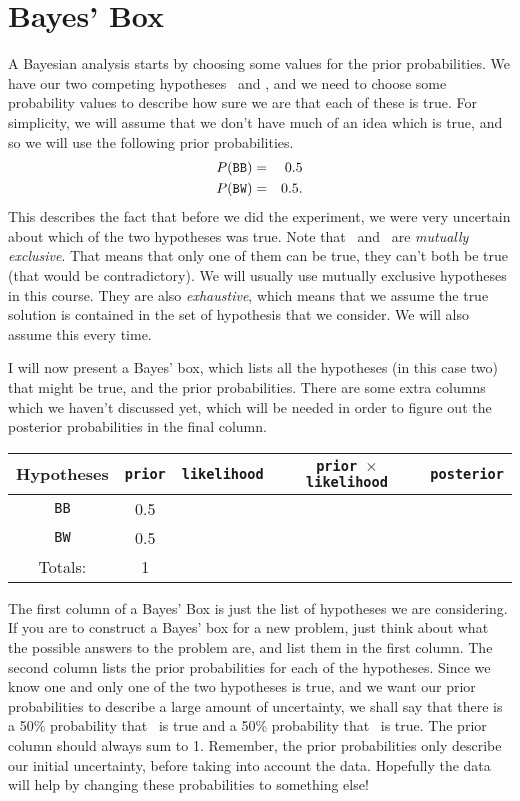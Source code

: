 \section{Bayes' Box}
A Bayesian analysis starts by choosing some values for the prior probabilities.
We have our two competing hypotheses \bw~and \bb, and we need to choose some
probability values to describe how sure we are that each of these is true.
For simplicity, we will assume that we don't have much of an idea which is true,
and so we will use the following prior probabilities.
\begin{eqnarray}
P(\texttt{BB}) &=& 0.5\\
P(\texttt{BW}) &=& 0.5.
\end{eqnarray}
This describes the fact that before we did the experiment, we were very
uncertain about which of the two hypotheses was true. Note that \bw~and \bb~are
{\it mutually exclusive}. That means that only one of
them can be true, they can't both be true (that would be contradictory). We will
usually use mutually exclusive hypotheses in this course. They are also
{\it exhaustive}, which means that we assume the true solution is contained
in the set of hypothesis that we consider. We will also assume this every time.

I will now present a Bayes' box, which lists all the hypotheses (in this case
two) that might be true, and the prior probabilities. There are some extra
columns which we haven't discussed yet, which will be needed in order to
figure out the posterior probabilities in the final column.
\begin{table}[h!]
\begin{center}
\begin{tabular}{|c|c|c|c|c|}
\hline
{\bf Hypotheses} & {\tt prior} & {\tt likelihood} &
{\tt prior $\times$ likelihood} & {\tt posterior}\\
\hline
{\tt BB} & 0.5 &   &  & \\
{\tt BW} & 0.5 &   &  & \\
\hline
Totals: & 1 & & & \\
\hline
\end{tabular}
\end{center}
\end{table}
The first column of a Bayes' Box is just the list of hypotheses we are
considering. If you are to construct a Bayes' box for a new problem, just think
about what the possible answers to the problem are, and list them in the first
column. The second column lists the prior probabilities for each of the
hypotheses.
Since we know one and only
one of the two hypotheses is true, and we want our prior probabilities to
describe a large amount of uncertainty, we shall say that there is a 50\%
probability that \bb~is true and a 50\% probability that \bw~is true.
The prior column should always sum to 1. Remember, the prior probabilities
only describe our initial uncertainty, before taking into account the
data. Hopefully the data will help by changing these probabilities to
something else!

